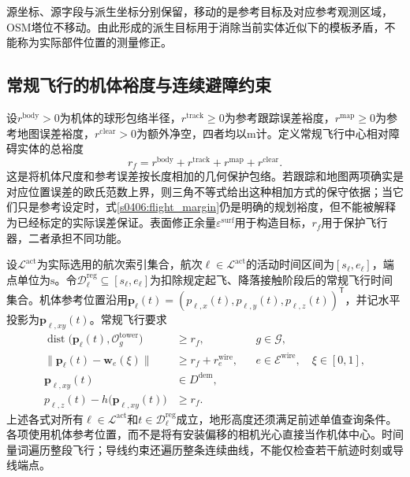 源坐标、源字段与派生坐标分别保留，移动的是参考目标及对应参考观测区域，OSM塔位不移动。由此形成的派生目标用于消除当前实体近似下的模板矛盾，不能称为实际部件位置的测量修正。

\subsection{常规飞行的机体裕度与连续避障约束}

设$r^{\mathrm{body}}>0$为机体的球形包络半径，$r^{\mathrm{track}}\ge0$为参考跟踪误差裕度，$r^{\mathrm{map}}\ge0$为参考地图误差裕度，$r^{\mathrm{clear}}>0$为额外净空，四者均以$\mathrm m$计。定义常规飞行中心相对障碍实体的总裕度
\begin{equation}
 r_f=r^{\mathrm{body}}+r^{\mathrm{track}}
       +r^{\mathrm{map}}+r^{\mathrm{clear}}.
 \label{s0406:flight_margin}
\end{equation}
这是将机体尺度和参考误差按长度相加的几何保护包络。若跟踪和地图两项确实是对应位置误差的欧氏范数上界，则三角不等式给出这种相加方式的保守依据；当它们只是参考设定时，式\eqref{s0406:flight_margin}仍是明确的规划裕度，但不能被解释为已经标定的实际误差保证。表面修正余量$\varepsilon^{\mathrm{surf}}$用于构造目标，$r_f$用于保护飞行器，二者承担不同功能。

设$\mathcal L^{\mathrm{act}}$为实际选用的航次索引集合，航次$\ell\in\mathcal L^{\mathrm{act}}$的活动时间区间为$[s_\ell,e_\ell]$，端点单位为$\mathrm s$。令$\mathcal D_\ell^{\mathrm{reg}}\subseteq[s_\ell,e_\ell]$为扣除规定起飞、降落接触阶段后的常规飞行时间集合。机体参考位置沿用$\mathbf p_\ell(t)=(p_{\ell,x}(t),p_{\ell,y}(t),p_{\ell,z}(t))^{\mathsf T}$，并记水平投影为$\mathbf p_{\ell,xy}(t)$。常规飞行要求
\begin{subequations}
\label{s0406:regular_collision_constraints}
\begin{align}
 \operatorname{dist}\bigl(\mathbf p_\ell(t),
             \mathcal O_g^{\mathrm{tower}}\bigr)
 &\ge r_f,
 &&g\in\mathcal G,
 \label{s0406:tower_clearance}\\
 \|\mathbf p_\ell(t)-\mathbf w_e(\xi)\|
 &\ge r_f+r_e^{\mathrm{wire}},
 &&e\in\mathcal E^{\mathrm{wire}},\quad\xi\in[0,1],
 \label{s0406:wire_clearance}\\
 \mathbf p_{\ell,xy}(t)&\in D^{\mathrm{dem}},
 \label{s0406:terrain_query_domain}\\
 p_{\ell,z}(t)-h\bigl(\mathbf p_{\ell,xy}(t)\bigr)
 &\ge r_f.
 \label{s0406:vertical_terrain_clearance}
\end{align}
\end{subequations}
上述各式对所有$\ell\in\mathcal L^{\mathrm{act}}$和$t\in\mathcal D_\ell^{\mathrm{reg}}$成立，地形高度还须满足前述单值查询条件。各项使用机体参考位置，而不是将有安装偏移的相机光心直接当作机体中心。时间量词遍历整段飞行；导线约束还遍历整条连续曲线，不能仅检查若干航迹时刻或导线端点。

